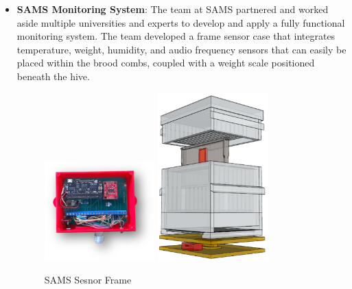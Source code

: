 \documentclass[12pt]{article}
\begin{document}
	\begin{itemize}
		
		\item \textbf{SAMS Monitoring System}: The team at SAMS partnered and worked aside multiple universities and experts to develop and apply a fully functional monitoring system. The team developed a frame sensor case that integrates temperature, weight, humidity, and audio frequency sensors that can easily be placed within the brood combs, coupled with a weight scale positioned beneath the hive.
		
		\begin{figure}[H]
			\centering
			\begin{minipage}{0.5\textwidth}
				\centering
				\caption{SAMS Sesnor Frame \cite{sams_project_results}}
				\label{fig:SAMS_HOOKED_FRAME}
			\end{minipage}  
			\hfill
			\begin{minipage}{0.45\textwidth}
				\centering
				\includegraphics[width=0.4\textwidth]{Images/Simillar/sams sensor case.png}
				\vfill
				\includegraphics[width=0.4\textwidth]{Images/Simillar/sams hive.png}

\end{minipage}
\end{figure}
\end{itemize}
\end{document}
